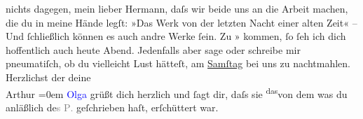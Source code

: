                nichts dagegen, mein lieber Hermann, daſs wir beide uns an die Arbeit machen, die du
               in meine {\pb}Hände legſt:
                  »\label{LL075-1v}Das Werk von der letzten Nacht einer alten
                  Zeit\label{LL075-1h}« – Und ſchließlich können es auch andre Werke ſein.\pend
           \pstart
           Zu »\label{K_L01477_3v}\label{K_L01477_3h}{ }kommen, ſo ſeh ich dich hoffentlich auch heute Abend.\pend
           \pstart
           Jedenfalls aber sage oder schreibe mir pneumatiſch, ob du vielleicht Lust hätteſt, am
                  \uline{Samſtag} bei uns zu nachtmahlen.\pend
           \pstart
           Herzlichst der deine{\\[\baselineskip]}\spacefill\mbox{Arthur{\pb}}\pend
           \leftskip=0em{}\pstart
           \noindent{}\textcolor{blue}{Olga}{}\ledrightnote{\textcolor{blue}{Olga Schnitzler}} grüßt dich herzlich und ſagt dir, daſs sie \substVorne{}\textsuperscript{das}\substDazwischen{}von dem\substHinten{} was du anläßlich de\textcolor{gray}{s \textsc{P}.}
                  geſchrieben haſt, erſchüttert war.\pend
           \endnumbering{}  
      